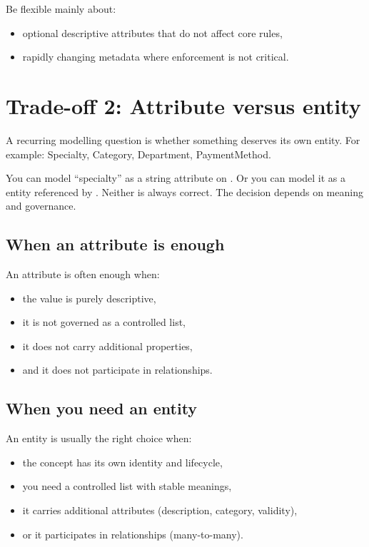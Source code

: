 Be flexible mainly about:
\begin{itemize}[leftmargin=*,nosep]
  \item optional descriptive attributes that do not affect core rules,
  \item rapidly changing metadata where enforcement is not critical.
\end{itemize}

\section{Trade-off 2: Attribute versus entity}
A recurring modelling question is whether something deserves its own entity.
For example: Specialty, Category, Department, PaymentMethod.

You can model “specialty” as a string attribute on .
Or you can model it as a  entity referenced by .
Neither is always correct.
The decision depends on meaning and governance.

\subsection{When an attribute is enough}
An attribute is often enough when:
\begin{itemize}[leftmargin=*,nosep]
  \item the value is purely descriptive,
  \item it is not governed as a controlled list,
  \item it does not carry additional properties,
  \item and it does not participate in relationships.
\end{itemize}

\subsection{When you need an entity}
An entity is usually the right choice when:
\begin{itemize}[leftmargin=*,nosep]
  \item the concept has its own identity and lifecycle,
  \item you need a controlled list with stable meanings,
  \item it carries additional attributes (description, category, validity),
  \item or it participates in relationships (many-to-many).
\end{itemize}

